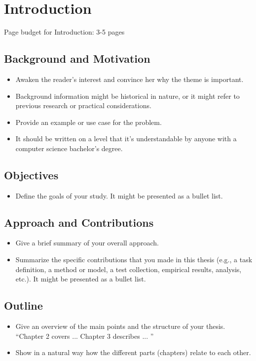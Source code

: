 
\chapter{Introduction}
\label{ch:intro}

Page budget for Introduction: 3-5 pages

\section{Background and Motivation}
\label{sec:background}
\begin{itemize}
    \item Awaken the reader's interest and convince her why the theme is important.
    \item Background information might be historical in nature, or it might refer to previous research or practical considerations.
    \item Provide an example or use case for the problem.
    \item It should be written on a level that it's understandable by anyone with a computer science bachelor's degree.
\end{itemize}

\section{Objectives}
\label{sec:objectives}
\begin{itemize}
   \item Define the goals of your study. It might be presented as a bullet list.
\end{itemize}


\section{Approach and Contributions}
\label{sec:approach}

\begin{itemize}
  \item Give a brief summary of your overall approach.
  \item Summarize the specific contributions that you made in this thesis (e.g., a task definition, a method or model, a test collection, empirical results, analysis, etc.). It might be presented as a bullet list.
\end{itemize}

\section{Outline}
\begin{itemize}
    \item Give an overview of the main points and the structure of your thesis. ``Chapter 2 covers ... Chapter 3 describes ... ''
    \item Show in a natural way how the different parts (chapters) relate to each other.
\end{itemize}
